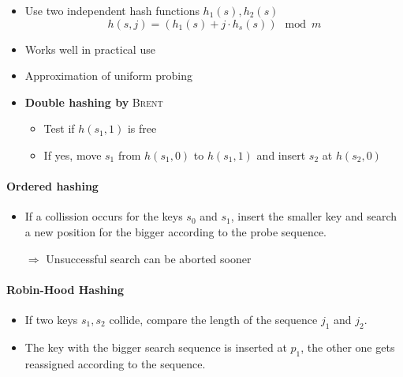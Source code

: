 \documentclass[12pt, a4paper]{scrartcl}
\renewcommand{\implies}{\Rightarrow}
\begin{document}
\begin{itemize}
\item Use two independent hash functions $h_1(s), h_2(s)$
  \begin{equation}
    h(s,j)=(h_1(s)+j\cdot h_s(s))\mod m
  \end{equation}
\item Works well in practical use
\item Approximation of uniform probing
\item \textbf{Double hashing by} \textsc{Brent}
  \begin{itemize}
  \item Test if $h(s_1,1)$ is free
  \item If yes, move $s_1$ from $h(s_1,0)$ to $h(s_1,1)$ and insert $s_2$ at $h(s_2,0)$
  \end{itemize}

\end{itemize}

\paragraph{Ordered hashing}
\begin{itemize}
\item If a collission occurs for the keys $s_0$ and $s_1$, insert the smaller key and search a new position for the bigger according to the probe sequence.
\item[$\implies$] Unsuccessful search can be aborted sooner
\end{itemize}

\paragraph{Robin-Hood Hashing}
\begin{itemize}
\item If two keys $s_1, s_2$ collide, compare the length of the sequence $j_1$ and $j_2$.
\item The key with the bigger search sequence is inserted at $p_1$, the other one gets reassigned according to the sequence.
\end{itemize}
\end{document}
